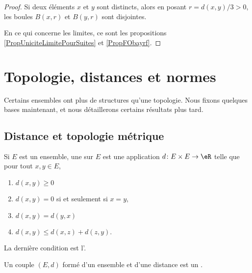 \begin{proof}
	Si deux éléments \( x \) et \( y \) sont distincts, alors en posant \( r = d(x , y) / 3 > 0 \), les boules \( B(x,r) \) et \( B(y,r)\) sont disjointes.

	En ce qui concerne les limites, ce sont les propositions \ref{PropUniciteLimitePourSuites} et \ref{PropFObayrf}.
\end{proof}

\section{Topologie, distances et normes}
Certains ensembles ont plus de structures qu'une topologie. Nous fixons quelques bases maintenant, et nous détaillerons certains résultats plus tard.

\subsection{Distance et topologie métrique}

\begin{definition}  \label{DefMVNVFsX}
	Si $E$ est un ensemble, une  sur $E$ est une application $d\colon E\times E\to \eR$ telle que pour tout $x,y\in E$,
	\begin{enumerate}

		\item
		      $d(x,y)\geq 0$

		\item
		      $d(x,y)=0$ si et seulement si $x=y$,

		\item
		      $d(x,y)=d(y,x)$

		\item
		      $d(x,y)\leq d(x,z)+d(z,y)$.

	\end{enumerate}
	La dernière condition est l'.

	Un couple $(E,d)$ formé d'un ensemble et d'une distance est un .
\end{definition}

